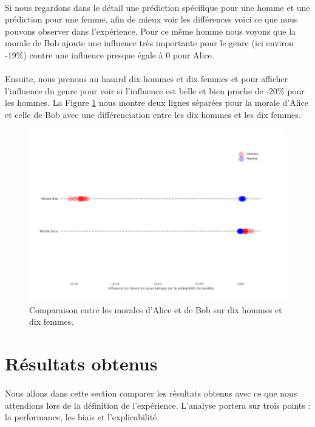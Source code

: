 \documentclass[10pt, french, a4paper]{report}
\begin{document}
\paragraph{}
Si nous regardons dans le détail une prédiction spécifique pour une homme et une prédiction pour une femme, afin de mieux voir les différences voici ce que nous pouvons observer dans l'expérience. Pour ce même homme nous voyons que la morale de Bob ajoute une influence très importante pour le genre (ici environ -19\%) contre une influence presque égale à 0 pour Alice. 

\paragraph{}
Ensuite, nous prenons au hasard dix hommes et dix femmes et pour afficher l'influence du genre pour voir si l'influence est belle et bien proche de -20\% pour les hommes. La Figure \ref{fig:comparaison_morale} nous montre deux lignes séparées pour la morale d'Alice et celle de Bob avec une différenciation entre les dix hommes et les dix femmes.

\begin{figure}[hbt!]
  \centering
  \includegraphics[width=\textwidth]{images/comparaison_local_influence.png}
  \caption{Comparaison entre les morales d'Alice et de Bob sur dix hommes et dix femmes.}
  \label{fig:comparaison_morale}
\end{figure}

\section{Résultats obtenus}

\paragraph{}
Nous allons dans cette section comparer les résultats obtenus avec ce que nous attendions lors de la définition de l'expérience. L'analyse portera sur trois points : la performance, les biais et l'explicabilité.
\end{document}
